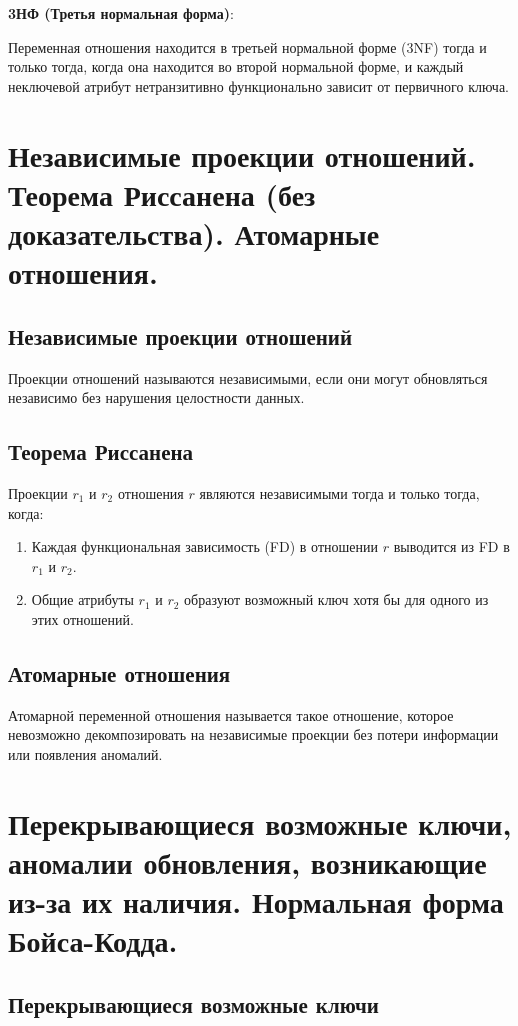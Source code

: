 \documentclass[a4paper,12pt]{article}
\begin{document}
\textbf{3НФ (Третья нормальная форма)}:

Переменная отношения находится в третьей нормальной форме (3NF) тогда и только тогда, когда она находится во второй нормальной форме, и каждый неключевой атрибут нетранзитивно функционально зависит от первичного ключа.

\section{Независимые проекции отношений. Теорема Риссанена (без доказательства). Атомарные отношения.}

\subsection{Независимые проекции отношений}

Проекции отношений называются независимыми, если они могут обновляться независимо без нарушения целостности данных.

\subsection{Теорема Риссанена}

Проекции \(r_1\) и \(r_2\) отношения \(r\) являются независимыми тогда и только тогда, когда:
\begin{enumerate}
    \item Каждая функциональная зависимость (FD) в отношении \(r\) выводится из FD в \(r_1\) и \(r_2\).
    \item Общие атрибуты \(r_1\) и \(r_2\) образуют возможный ключ хотя бы для одного из этих отношений.
\end{enumerate}

\subsection{Атомарные отношения}

Атомарной переменной отношения называется такое отношение, которое невозможно декомпозировать на независимые проекции без потери информации или появления аномалий.

\section{Перекрывающиеся возможные ключи, аномалии обновления, возникающие из-за их наличия. Нормальная форма Бойса-Кодда.}

\subsection{Перекрывающиеся возможные ключи}
\end{document}
